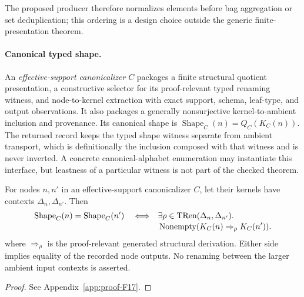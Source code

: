 The proposed producer therefore normalizes elements before bag aggregation or
set deduplication; this ordering is a design choice outside the generic
finite-presentation theorem.

\paragraph{Canonical typed shape.}
An \emph{effective-support canonicalizer} $C$ packages a finite structural
quotient presentation, a constructive selector for its proof-relevant typed
renaming witness, and node-to-kernel extraction with exact support, schema,
leaf-type, and output observations.  It also packages a generally
nonsurjective kernel-to-ambient inclusion and provenance.  Its canonical shape is
$\operatorname{Shape}_C(n)=Q_C(K_C(n))$.  The returned record keeps the typed
shape witness separate from ambient transport, which is definitionally the
inclusion composed with that witness and is never inverted.  A concrete
canonical-alphabet enumeration may instantiate this interface, but leastness
of a particular witness is not part of the checked theorem.

\begin{corollary}
\label{cor:shape-exactness}
For nodes $n,n'$ in an effective-support canonicalizer $C$, let their kernels
have contexts $\Delta_n,\Delta_{n'}$.  Then
\begin{align*}
\leanref{TSG-ATOM-026}{TypedSlottedEGraphsPaper.NormalizationBridge.EffectiveSupportCanonicalizer.canonicalShape_eq_iff_effectiveKernel_typedRenaming}
\operatorname{Shape}_{C}(n)=\operatorname{Shape}_{C}(n')
\quad\Longleftrightarrow\quad
&\exists\rho\in\TRen(\Delta_n,\Delta_{n'}).\\[-2pt]
&\operatorname{Nonempty}(K_C(n)\Rightarrow_\rho K_C(n')).
\end{align*}
where $\Rightarrow_\rho$ is the proof-relevant generated structural
derivation.  Either side implies equality of the recorded node outputs.  No
renaming between the larger ambient input contexts is asserted.
\end{corollary}
\begin{proof}See Appendix~\ref{app:proof-F17}.\end{proof}

